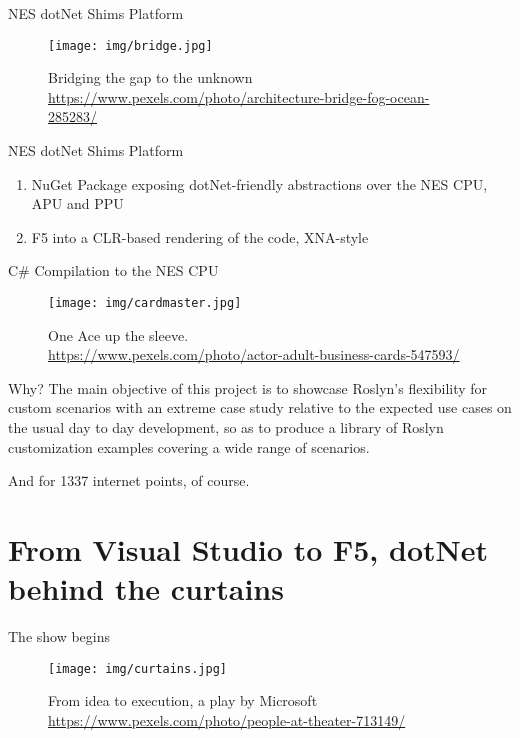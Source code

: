 \documentclass[10pt]{beamer}
\begin{document}
\begin{frame}{NES dotNet Shims Platform}
    \begin{figure}
        \centering
        \texttt{[image: img/bridge.jpg]}
        \caption{Bridging the gap to the unknown \\ \tiny{\href{Photo by Nikolai Ulltang from Pexels}{https://www.pexels.com/photo/architecture-bridge-fog-ocean-285283/}}}
    \end{figure}
\end{frame}

\begin{frame}{NES dotNet Shims Platform}
    \begin{enumerate}
        \item NuGet Package exposing dotNet-friendly abstractions over the NES CPU, APU and PPU
        \item F5 into a CLR-based rendering of the code, XNA-style
    \end{enumerate}
\end{frame}

\begin{frame}{C\# Compilation to the NES CPU}
    \begin{figure}
        \centering
        \texttt{[image: img/cardmaster.jpg]}
        \caption{One Ace up the sleeve. \\ \tiny{\href{Photo by Nikolai Ivanov from Pexels}{https://www.pexels.com/photo/actor-adult-business-cards-547593/}}}
    \end{figure}
\end{frame}

\begin{frame}{Why?}
The main objective of this project is to showcase Roslyn's flexibility for custom scenarios with an extreme case study relative to the expected use cases on the usual day to day development, so as to produce a library of Roslyn customization examples covering a wide range of scenarios. 

And for 1337 internet points, of course.
\end{frame}

\section{From Visual Studio to F5, dotNet behind the curtains}
\begin{frame}{The show begins}
    \begin{figure}
        \centering
        \texttt{[image: img/curtains.jpg]}
        \caption{From idea to execution, a play by Microsoft \\ \tiny{\href{Photo by Monica Silvestre from Pexels}{https://www.pexels.com/photo/people-at-theater-713149/}}}
    \end{figure}
\end{frame}
\end{document}
